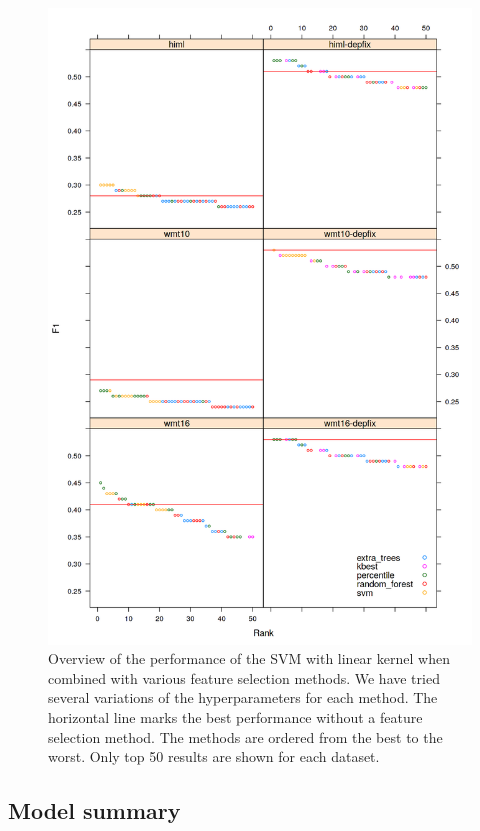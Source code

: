 \begin{figure}
\centering
  \includegraphics[scale=0.7]{wf-sel}
  \caption{
    Overview of the performance of the SVM with linear kernel when combined with various feature selection methods.
We have tried several variations of the hyperparameters
for each method. The horizontal line marks the best performance without
a feature selection method. The methods are ordered from the best to the worst. Only top 50 results
are shown for each dataset.
}
  \label{wf-sel}
\end{figure}


\subsection{Model summary}

